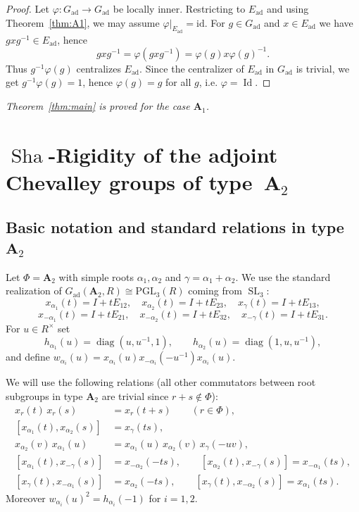 \documentclass[]{jgcc}
\DeclareMathOperator{\Id}{Id}
\DeclareMathOperator{\SL}{SL}
\numberwithin{equation}{section}
\newcommand{\diag}{\operatorname{diag}}
\newcommand{\Sha}{\operatorname{Sha}}
\begin{document}
\begin{proof}
Let $\varphi:G_{\mathrm{ad}}\to G_{\mathrm{ad}}$ be locally inner. Restricting to $E_{\mathrm{ad}}$ and using Theorem~\ref{thm:A1},
we may assume $\varphi|_{E_{\mathrm{ad}}}=\mathrm{id}$.
For $g\in G_{\mathrm{ad}}$ and $x\in E_{\mathrm{ad}}$ we have $gxg^{-1}\in E_{\mathrm{ad}}$, hence
\[
gxg^{-1}= \varphi(gxg^{-1})= \varphi(g)x\varphi(g)^{-1}.
\]
Thus $g^{-1}\varphi(g)$ centralizes $E_{\mathrm{ad}}$. Since the centralizer of $E_{\mathrm{ad}}$ in $G_{\mathrm{ad}}$ is trivial,
we get $g^{-1}\varphi(g)=1$, hence $\varphi(g)=g$ for all $g$, i.e. $\varphi=\Id$.
\end{proof}

\medskip
\textit{Theorem~\ref{thm:main} is proved for the case $\mathbf A_1$.}

\section{\texorpdfstring{$\Sha$-Rigidity of the adjoint Chevalley groups of type~$\mathbf A_2$}{Sha-Rigidity of the adjoint Chevalley groups of type A2}}\label{sec:A2}

\subsection{\texorpdfstring{Basic notation and standard relations in type $\mathbf A_2$}{Basic notation and standard relations in type A2}}

Let $\Phi=\mathbf A_2$ with simple roots $\alpha_1,\alpha_2$ and $\gamma=\alpha_1+\alpha_2$.
We use the standard realization of $G_{\mathrm{ad}}(\mathbf A_2,R)\cong \mathrm{PGL}_3(R)$ coming from $\SL_3$:
\[
x_{\alpha_1}(t)=I+tE_{12},\quad
x_{\alpha_2}(t)=I+tE_{23},\quad
x_{\gamma}(t)=I+tE_{13},
\]
\[
x_{-\alpha_1}(t)=I+tE_{21},\quad
x_{-\alpha_2}(t)=I+tE_{32},\quad
x_{-\gamma}(t)=I+tE_{31}.
\]
For $u\in R^\times$ set
\[
h_{\alpha_1}(u)=\diag(u,u^{-1},1),\qquad
h_{\alpha_2}(u)=\diag(1,u,u^{-1}),
\]
and define $w_{\alpha_i}(u)=x_{\alpha_i}(u)x_{-\alpha_i}(-u^{-1})x_{\alpha_i}(u)$.

We will use the following relations (all other commutators between root subgroups in type $\mathbf A_2$
are trivial since $r+s\notin\Phi$):
\begin{align*}
x_r(t)\,x_r(s)&=x_r(t+s)\qquad (r\in\Phi),\\
[x_{\alpha_1}(t),x_{\alpha_2}(s)]&=x_{\gamma}(ts),\\
x_{\alpha_2}(v)\,x_{\alpha_1}(u)&=
x_{\alpha_1}(u)\,x_{\alpha_2}(v)\,x_{\gamma}(-uv),\\
[x_{\alpha_1}(t),x_{-\gamma}(s)]&=x_{-\alpha_2}(-ts),\qquad
[x_{\alpha_2}(t),x_{-\gamma}(s)]=x_{-\alpha_1}(ts),\\
[x_{\gamma}(t),x_{-\alpha_1}(s)]&=x_{\alpha_2}(-ts),\qquad
[x_{\gamma}(t),x_{-\alpha_2}(s)]=x_{\alpha_1}(ts).
\end{align*}
Moreover $w_{\alpha_i}(u)^2=h_{\alpha_i}(-1)$ for $i=1,2$.
\end{document}
